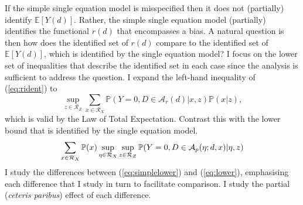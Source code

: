 \documentclass[10pt,a4paper,twoside]{article}
\numberwithin{equation}{section}
\begin{document}
If the simple single equation model is misspecified then it does not (partially) identify $\mathbb{E}[Y(d)]$. Rather, the simple single equation model (partially) identifies the functional $r(d)$ that encompasses a bias. A natural question is then how does the identified set of $r(d)$ compare to the identified set of $\mathbb{E}[Y(d)]$, which is identified by the single equation model? I focus on the lower set of inequalities that describe the identified set in each case since the analysis is sufficient to address the question. I expand the left-hand inequality of (\ref{eq:rident}) to
\begin{equation}
\sup_{z\in\mathcal{R}_Z}\sum_{x\in\mathcal{R}_X}\mathbb{P}(Y=0,D\in\mathcal{A}_r(d)|x,z)\mathbb{P}(x|z),\label{eq:simplelower}
\end{equation}
which is valid by the Law of Total Expectation. Contrast this with the lower bound that is identified by the single equation model. 
\begin{equation}
\sum_{x\in\mathcal{R}_X}\mathbb{P}(\color{black}x\color{black})\color{black}\sup_{\eta\in\mathcal{R}_X}\sup_{z\in\mathcal{R}_Z}\color{black}\mathbb{P}(Y=0,D\in\color{black}\mathcal{A}_p(\eta;d,x)\color{black}|\color{black}\eta\color{black},z)\label{eq:lower}
\end{equation} 
I study the differences between (\ref{eq:simplelower}) and (\ref{eq:lower}), emphasising each difference that I study in turn to facilitate comparison. I study the partial (\emph{ceteris paribus}) effect of each difference.
\end{document}
